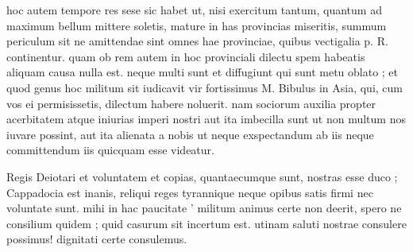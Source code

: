  hoc autem tempore res sese sic habet ut, nisi exercitum tantum, quantum ad maximum bellum mittere soletis, mature in has provincias miseritis, summum periculum sit ne amittendae sint omnes hae provinciae, quibus vectigalia p. R. continentur. quam ob rem autem in hoc provinciali dilectu spem habeatis aliquam causa nulla est. neque multi sunt et diffugiunt qui sunt metu oblato ; et quod genus hoc militum sit iudicavit vir fortissimus M. Bibulus in Asia, qui, cum vos ei permisissetis, dilectum habere noluerit. nam sociorum auxilia propter acerbitatem atque iniurias imperi nostri aut ita imbecilla sunt ut non multum nos iuvare possint, aut ita alienata a nobis ut neque exspectandum ab iis neque committendum iis quicquam esse videatur.

 Regis Deiotari et voluntatem et copias, quantaecumque sunt, nostras esse duco ; Cappadocia est inanis, reliqui reges tyrannique neque opibus satis firmi nec voluntate sunt. mihi in hac paucitate ' militum animus certe non deerit, spero ne consilium quidem ; quid casurum sit incertum est. utinam saluti nostrae consulere possimus! dignitati certe consulemus.
